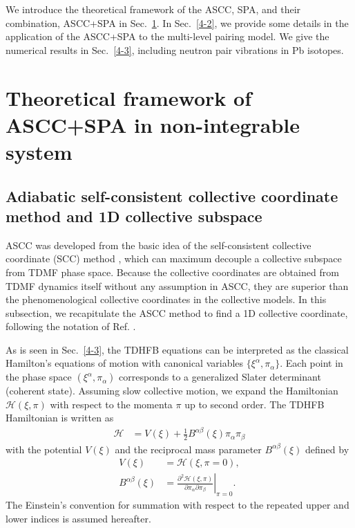 \documentclass[11pt]{book} %
\begin{document}
We introduce the theoretical framework of the ASCC, SPA,
and their combination, ASCC+SPA in Sec.~\ref{4-1}. 
In Sec.~\ref{4-2}, we provide some details in the application
of the ASCC+SPA to the multi-level pairing model.
We give the numerical results in Sec.~\ref{4-3}, including
neutron pair vibrations in Pb isotopes.

\section{Theoretical framework of ASCC+SPA in non-integrable system}
\label{4-1}
\subsection{Adiabatic self-consistent collective coordinate method and
1D collective subspace}
\label{sec:ASCC}
ASCC was developed from the basic idea of the self-consistent collective coordinate (SCC) method \cite{MMSK80}, which can maximum decouple a collective subspace from TDMF phase space.
Because the collective coordinates are obtained from TDMF dynamics itself without any assumption in ASCC, they are superior than the phenomenological collective coordinates in the collective models.
In this subsection,
we recapitulate the ASCC method to find a 1D collective coordinate,
following the notation of Ref. \cite{N2012}.

As is seen in Sec.~\ref{4-3}, the TDHFB equations can be
interpreted as the classical Hamilton's equations of motion
with canonical variables $\{\xi^{\alpha},\pi_{\alpha}\}$. 
Each point in the phase space $(\xi^{\alpha},\pi_{\alpha})$
corresponds to a generalized Slater determinant (coherent state).
Assuming slow collective motion,
we expand the Hamiltonian $\mathcal{H}(\xi,\pi)$ with respect to
the momenta $\pi$ up to second order.
The TDHFB Hamiltonian is written as
\begin{align}
 \mathcal{H} &= V(\xi) + \frac{1}{2}B^{\alpha\beta}(\xi)\pi_{\alpha}\pi_{\beta}
\end{align}
with the potential $V(\xi)$ and
the reciprocal mass parameter $B^{\alpha\beta}(\xi)$ defined by
\begin{align}
  V(\xi) &= \mathcal{H}(\xi,\pi=0) , \\
  B^{\alpha\beta}(\xi) &= \left. \frac{\partial^2\mathcal{H}(\xi,\pi)}{\partial\pi_{\alpha}\partial\pi_{\beta}} \right|_{\pi=0}.
\end{align}
The Einstein's convention for summation with respect to the repeated
upper and lower indices is assumed hereafter.
\end{document}
